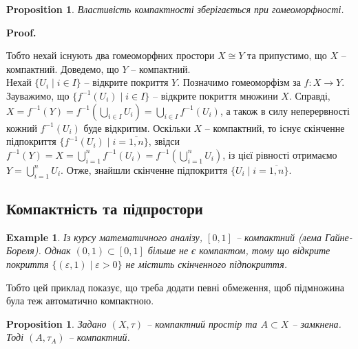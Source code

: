 \documentclass[a4paper, 10pt]{article}
\makeatletter
\theoremstyle{theoremdd}
\newtheorem{example}[theorem]{Example}
\newtheorem{proposition}[theorem]{Proposition}
\renewenvironment{proof}[1][Proof.\\]{\par
\pushQED{\hfill \qed}%
\normalfont \topsep6\p@\@plus6\p@\relax
\trivlist
\item\relax
{\bfseries
#1\@addpunct{.}}\hspace\labelsep\ignorespaces
}{%
\popQED\endtrivlist\@endpefalse
}
\makeatother
\begin{document}
\begin{proposition}
Властивість компактності зберігається при гомеоморфності.
\end{proposition}

\begin{proof}
Тобто нехай існують два гомеоморфних простори $X \cong Y$ та припустимо, що $X$ -- компактний. Доведемо, що $Y$ -- компактний.\\
Нехай $\{U_i \mid i \in I\}$ -- відкрите покриття $Y$. Позначимо гомеоморфізм за $f \colon X \to Y$. Зауважимо, що $\{ f^{-1}(U_i) \mid i \in I \}$ -- відкрите покриття множини $X$. Справді, $X = f^{-1}(Y) = \displaystyle f^{-1}\left( \bigcup_{i \in I} U_i \right) = \bigcup_{i \in I} f^{-1}(U_i)$, а також в силу неперервності кожний $f^{-1}(U_i)$ буде відкритим. Оскільки $X$ -- компактний, то існує скінченне підпокриття $\{f^{-1}(U_i) \mid i = \overline{1,n}\}$, звідси $f^{-1}(Y) = X = \displaystyle\bigcup_{i=1}^n f^{-1}(U_i) = f^{-1}\left(\bigcup_{i=1}^n U_i \right)$, із цієї рівності отримаємо $Y = \displaystyle\bigcup_{i=1}^n U_i$. Отже, знайшли скінченне підпокриття $\{U_i \mid i = \overline{1,n}\}$.
\end{proof}

\subsection{Компактність та підпростори}
\begin{example}
Із курсу математичного аналізу, $[0,1]$ -- компактний (лема Гайне-Бореля). Однак $(0,1) \subset [0,1]$ більше не є компактом, тому що відкрите покриття $\{(\varepsilon,1) \mid \varepsilon > 0\}$ не містить скінченного підпокриття.
\end{example}
\noindent
Тобто цей приклад показує, що треба додати певні обмеження, щоб підмножина була теж автоматично компактною.

\begin{proposition}
Задано $(X,\tau)$ -- компактний простір та $A \subset X$ -- замкнена. Тоді $(A,\tau_A)$ -- компактний.
\end{proposition}
\end{document}
